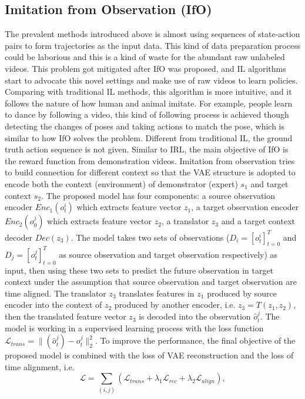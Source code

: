 \documentclass[acmsmall]{acmart}
\begin{document}
\subsection{Imitation from Observation (IfO)}
\label{ifo}
The prevalent methods introduced above is almost using sequences of state-action pairs to form trajectories as the input data. This kind of data preparation process could be laborious and this is a kind of waste for the abundant raw unlabeled videos. This problem got mitigated after IfO\cite{liuImitationObservationLearning2018} was proposed, and IL algorithms start to advocate this novel settings and make use of raw videos to learn policies. Comparing with traditional IL methods, this algorithm is more intuitive, and it follows the nature of how human and animal imitate. For example, people learn to dance by following a video, this kind of following process is achieved though detecting the changes of poses and taking actions to match the pose, which is similar to how IfO solves the problem. Different from traditional IL, the ground truth action sequence is not given. Similar to IRL, the main objective of IfO is the reward function from demonstration videos. Imitation from observation tries to build connection for different context so that the VAE structure is adopted to encode both the context (environment) of demonstrator (expert) $s_{1}$ and target context $s_{2}$. The proposed model has four components: a source observation encoder $Enc_1 (o_t^i)$ which extracts feature vector $z_1$, a target observation encoder $Enc_2 (o_0^j)$ which extracts feature vector $z_2$, a translator $z_3$ and a target context decoder $Dec(z_3)$. The model takes two sets of observations ($D_i = [o_t^i]_{t=0}^T$ and $D_j = [o_t^j]_{t=0}^T$ as source observation and target observation respectively) as input, then using these two sets to predict the future observation in target context under the assumption that source observation and target observation are time aligned. The translator $z_3$ translates features in $z_1$ produced by source encoder into the context of $z_2$ produced by another encoder, i.e. $z_3 = T(z_1, z_2)$, then the translated feature vector $z_3$ is decoded into the observation $\hat{o}_t^j$. The model is working in a supervised learning process with the loss function $\mathcal{L}_{trans} = \lVert (\hat{o}_t^j)-o_t^j\rVert_2^2$. To improve the performance, the final objective of the proposed model is combined with the loss of VAE reconstruction and the loss of time alignment, i.e.
\[
\mathcal{L} = \sum_{(i,j)}(\mathcal{L}_{trans}+\lambda_1 \mathcal{L}_{rec}+\lambda_2 \mathcal{L}_{align}),
\]
\end{document}
